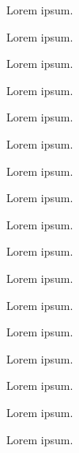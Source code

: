  \label{sec:state:doctrine-forms}

Lorem ipsum.

 \label{sec:state:curl}

Lorem ipsum.

 \label{sec:state:curl-ca-bundle}

Lorem ipsum.

 \label{sec:state:autowired}

Lorem ipsum.

 \label{sec:state:forms-replicator}

Lorem ipsum.

 \label{sec:state:translation}

Lorem ipsum.

 \label{sec:state:validator}

Lorem ipsum.

 \label{sec:state:rabbit-mq}

Lorem ipsum.

 \label{sec:state:money}

Lorem ipsum.

 \label{sec:state:doctrine-money}

Lorem ipsum.

 \label{sec:state:aop}

Lorem ipsum.

 \label{sec:state:clock}

Lorem ipsum.

 \label{sec:state:redis}

Lorem ipsum.

 \label{sec:state:parse-use-statements}

Lorem ipsum.

 \label{sec:state:redis-active-lock}

Lorem ipsum.

 \label{sec:state:tester-parallel-stress}

Lorem ipsum.

 \label{sec:state:monolog}

Lorem ipsum.

